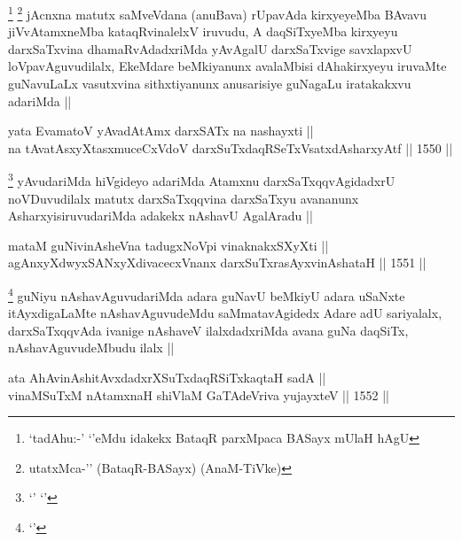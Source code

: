 \begin{artha}
\footnote{`tadAhu:-' `\stext'eMdu idakekx BataqR parxMpaca BASayx mUlaH hAgU}
\footnote{utatxMca-'\stext' (BataqR-BASayx) (AnaM-TiVke)}
jAcnxna matutx saMveVdana (anuBava) rUpavAda kirxyeyeMba BAvavu jiVvAtamxneMba kataqRvinalelxV iruvudu, A daqSiTxyeMba kirxyeyu darxSaTxvina dhamaRvAdadxriMda yAvAgalU darxSaTxvige savxlapxvU loVpavAguvudilalx, EkeMdare beMkiyanunx avalaMbisi dAhakirxyeyu iruvaMte guNavuLaLx vasutxvina sithxtiyanunx anusarisiye guNagaLu iratakakxvu adariMda ||
\end{artha}

\begin{shl}
yata EvamatoV yAvadAtAmx darxSATx na nashayxti || \\
na tAvatAsxyXtasxmuceCxVdoV darxSuTxdaqRSeTxVsatxdAsharxyAtf ||  1550 ||  
\end{shl}

\begin{artha}
\footnote{`\stext' `\stext'}
yAvudariMda hiVgideyo adariMda Atamxnu darxSaTxqqvAgidadxrU noVDuvudilalx matutx darxSaTxqqvina darxSaTxyu avananunx AsharxyisiruvudariMda adakekx nAshavU AgalAradu ||
\end{artha}


\begin{shl}
mataM guNivinAsheVna tadugxNoV\s pi vinaknakxSXyXti || \\
agAnxyXdwyxSANxyXdivacecxVnanx darxSuTxrasAyxvinAshataH ||  1551 ||  
\end{shl}

\begin{artha}
\footnote{`\stext'}
guNiyu nAshavAguvudariMda adara guNavU beMkiyU adara uSaNxte itAyxdigaLaMte nAshavAguvudeMdu saMmatavAgidedx Adare adU sariyalalx, darxSaTxqqvAda ivanige nAshaveV ilalxdadxriMda avana guNa daqSiTx, nAshavAguvudeMbudu ilalx ||
\end{artha}



\begin{shl}
ata AhAvinAshitAvxdadxrXSuTxdaqRSiTxkaqtaH sadA ||  \\
vinaMSuTxM nA\s \s tamxnaH shiVlaM GaTAdeVriva yujayxteV ||  1552 ||  
\end{shl}

